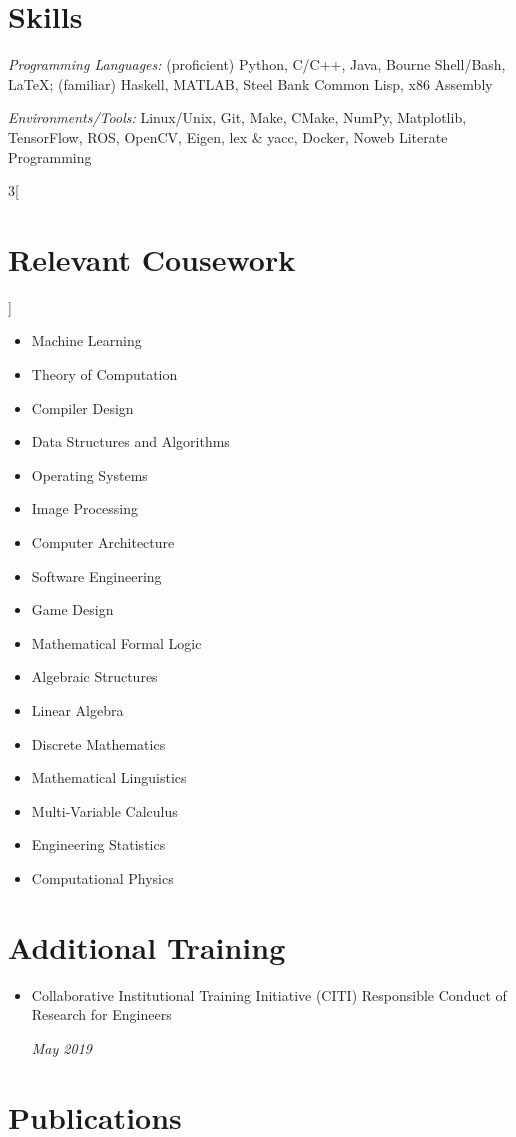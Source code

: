 \documentclass[\ifdefined\cv11pt\else10pt\fi,letterpaper,roman]{moderncv}
\newcommand{\cvonly}[1]{\ifdefined\cv#1\fi}
\renewcommand{\cvitem}[2]{\item {#1}\hfill\textit{#2}}
\let\oldsection\section
\renewcommand{\section}[1]{\vspace*{-1.3ex}\oldsection{#1}}
\begin{document}
\setlength{\premulticols}{0pt}
\section{Skills}
\textit{Programming Languages:} (proficient) Python, C/C++, Java, Bourne Shell/Bash, \LaTeX; (familiar) Haskell, MATLAB\cvonly{, Steel Bank Common Lisp, x86 Assembly} \par
\textit{Environments/Tools:} Linux/Unix, Git, Make, CMake, NumPy, Matplotlib, TensorFlow, ROS, OpenCV\cvonly{, Eigen}, lex \& yacc\cvonly{, Docker, Noweb Literate Programming} \par %
\begin{multicols}{3}[\section{Relevant Cousework}\vspace*{-1.2\topsep}]
\begin{itemize}
	\item Machine Learning
	\item Theory of Computation
	\item Compiler Design
	\item Data Structures and Algorithms
	\item Operating Systems
	\item Image Processing
	\item Computer Architecture
	\item Software Engineering
	\cvonly{\item Game Design}
	\item Mathematical Formal Logic
	\item Algebraic Structures
	\item Linear Algebra
	\item Discrete Mathematics
	\cvonly{
		\item Mathematical Linguistics
		\item Multi-Variable Calculus
		\item Engineering Statistics
		\item Computational Physics
	}
\end{itemize}
\end{multicols}
\vspace{-2.8ex}

\cvonly{
\section{Additional Training}
\begin{itemize}
	\cvitem{
		\parbox[t]{0.85\linewidth}{Collaborative Institutional Training Initiative (CITI) Responsible Conduct of Research for Engineers}}{May 2019}
\end{itemize}
}


\section{Publications}
	\nocite{*}
	\printbibliography[heading=none]{}
\end{document}
